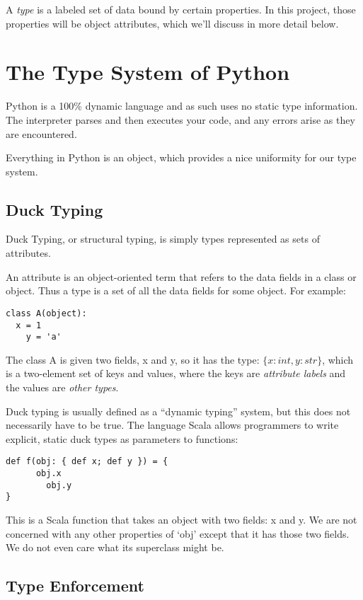 \documentclass{article}
\begin{document}
A \emph{type} is a labeled set of data bound by certain properties. In this
project, those properties will be object attributes, which we'll discuss in
more detail below.

\section*{The Type System of Python}

Python is a 100\% dynamic language and as such uses no static type information.
The interpreter parses and then executes your code, and any errors arise as
they are encountered.

Everything in Python is an object, which provides a nice uniformity for our
type system.

\subsection*{Duck Typing}

Duck Typing, or structural typing, is simply types represented as sets of attributes.

An attribute is an object-oriented term that refers to the data fields in a class or object. Thus a type is a set of all the data fields for some object. For example:

\begin{verbatim}
class A(object):
  x = 1
	y = 'a'
\end{verbatim}

The class A is given two fields, x and y, so it has the type: $\{x : int, y : str\}$, which is a two-element set of keys and values, where the keys are \emph{attribute labels} and the values are \emph{other types}.

Duck typing is usually defined as a ``dynamic typing'' system, but this does
not necessarily have to be true.  The language Scala allows programmers to
write explicit, static duck types as parameters to functions:

\begin{verbatim}
def f(obj: { def x; def y }) = {
	  obj.x
		obj.y
}
\end{verbatim}

This is a Scala function that takes an object with two fields: x and y. We are not concerned with any other properties of `obj' except that it has those two fields. We do not even care what its superclass might be.

\subsection*{Type Enforcement}
\end{document}
